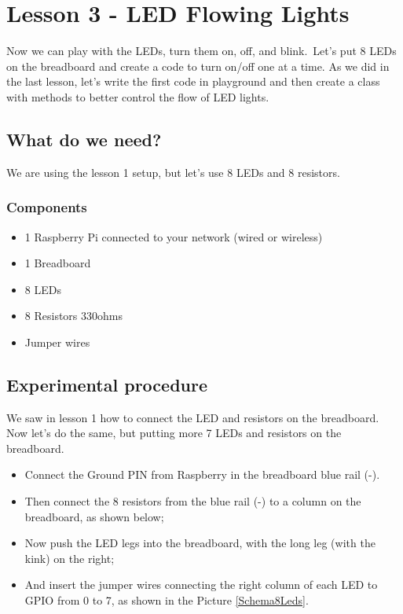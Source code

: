 \documentclass[10pt,twoside,english]{_support/latex/sbabook/sbabook}
\begin{document}
\frontmatter
\pagestyle{plain}

\tableofcontents*
\clearpage\listoffigures

\mainmatter

\chapter{Lesson 3 - LED Flowing Lights}
Now we can play with the LEDs, turn them on, off, and blink. Let's put 8 LEDs on the breadboard and create a code to turn on/off one at a time. As we did in the last lesson, let's write the first code in playground and then create a class with methods to better control the flow of LED lights.
\section{What do we need?}
We are using the lesson 1 setup, but let's use 8 LEDs and 8 resistors.
\subsection{Components}
\begin{itemize}
\item 1 Raspberry Pi connected to your network (wired or wireless)
\item 1 Breadboard
\item 8 LEDs
\item 8 Resistors 330ohms
\item Jumper wires
\end{itemize}
\section{Experimental procedure}
We saw in lesson 1 how to connect the LED and resistors on the breadboard. Now let's do the same, but putting more 7 LEDs and resistors on the breadboard.

\begin{itemize}
\item Connect the Ground PIN from Raspberry in the breadboard blue rail (-). 
\item Then connect the 8 resistors from the blue rail (-) to a column on the breadboard, as shown below;
\item Now push the LED legs into the breadboard, with the long leg (with the kink) on the right;
\item And insert the jumper wires connecting the right column of each LED to GPIO from 0 to 7, as shown in the Picture \ref{Schema8Leds}.
\end{itemize}
\end{document}
